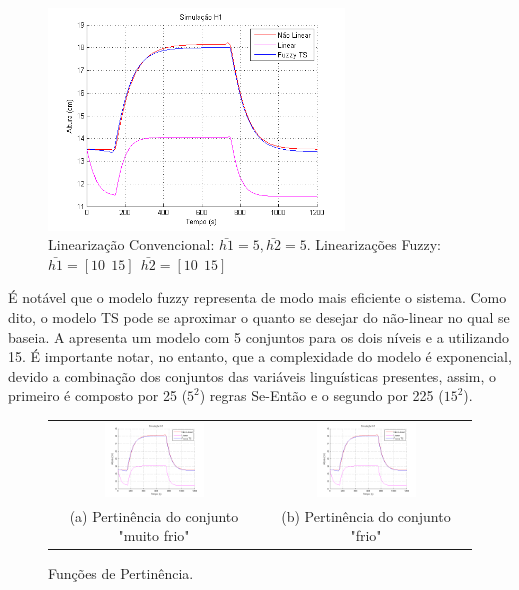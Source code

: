 \begin{figure}[H]
	\centering
	\includegraphics[width=0.7\textwidth]{img/FM_h1_5_10_15.png}
	\caption{\small Linearização Convencional: $ \bar{h1}=5, \bar{h2}=5$. Linearizações Fuzzy: $\bar{h1}=[10 \ \ 15] \ \ \bar{h2}=[10 \ \ 15]$ }
	\label{figH2TS2}
\end{figure}

É notável que o modelo fuzzy representa de modo mais eficiente o sistema. Como dito, o modelo TS pode se aproximar o quanto se desejar do não-linear no qual se baseia. A  apresenta um modelo com 5 conjuntos para os dois níveis e a  utilizando 15. É importante notar, no entanto, que a complexidade do modelo é exponencial, devido a combinação dos conjuntos das variáveis linguísticas presentes, assim, o primeiro é composto por 25 ($5^2$) regras Se-Então e o segundo por 225 ($15^2$).

\begin{figure}[H]
	\centering
	\begin{tabular}{cc}
		\includegraphics[width=0.5\textwidth,keepaspectratio]{img/FM_h1_5_10_15.png} &
		\includegraphics[width=0.5\textwidth,keepaspectratio]{img/FM_h1_5_10_15.png} \\
		(a) Pertinência do conjunto "muito frio" &
		(b) Pertinência do conjunto "frio"
	\end{tabular}
	\caption{\label{imgTS5} Funções de Pertinência.}
\end{figure}

